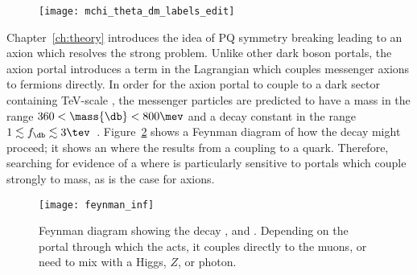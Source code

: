 \begin{figure}
  \begin{center}
    \texttt{[image: mchi\_theta\_dm\_labels\_edit]}
    \caption[Parameter space for a model including an inflaton]
    {
    }
    \label{fig:db:inflaton}
  \end{center}
\end{figure}


Chapter~\ref{ch:theory} introduces the idea of \gls{PQ} symmetry breaking leading to an axion
which resolves the strong \CP problem.
Unlike other dark boson portals, the axion portal introduces a term in the Lagrangian which couples
messenger axions to fermions directly.
In order for the axion portal to couple to a dark sector containing TeV-scale \dm, the messenger
particles are predicted to have a mass in the range $360<\mass{\db}<800\mev$ and a decay
constant in the range $1\lesssim f_\db\lesssim3\tev$~\cite{Nomura:2008ru}.
Figure~\ref{fig:db:feynman} shows a Feynman diagram of how the decay \btokstrdb might proceed;
it shows an \fcnc where the \db results from a coupling to a \tquark quark.
Therefore, searching for evidence of a \btokstrdb where \dbtomumu is particularly sensitive to
portals which couple strongly to mass, as is the case for axions.

\begin{figure}
  \begin{center}
    \texttt{[image: feynman\_inf]}
    \caption[Feynman diagram for the decay \btokstrdb]
    {
      Feynman diagram showing the decay \btokstrdb, and \dbtomumu.
      Depending on the portal through which the \db acts, it couples directly to the muons, or need
      to mix with a \sm Higgs, $Z$, or photon.
    }
    \label{fig:db:feynman}
  \end{center}
\end{figure}

